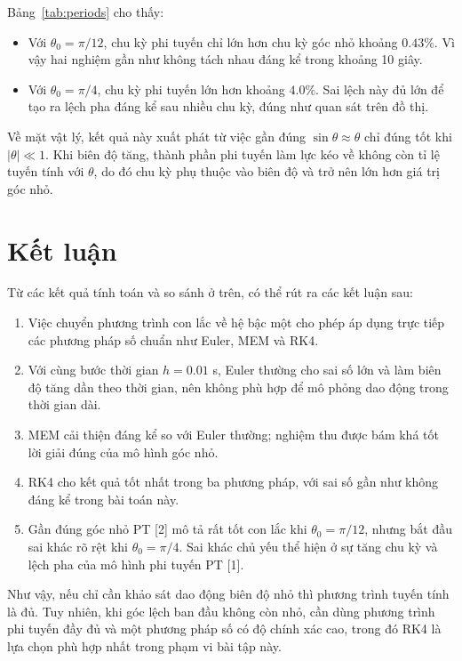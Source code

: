 \documentclass{article}
\begin{document}
Bảng~\ref{tab:periods} cho thấy:
\begin{itemize}
    \item Với $\theta_0=\pi/12$, chu kỳ phi tuyến chỉ lớn hơn chu kỳ góc nhỏ khoảng $0.43\%$. Vì vậy hai nghiệm gần như không tách nhau đáng kể trong khoảng 10 giây.
    \item Với $\theta_0=\pi/4$, chu kỳ phi tuyến lớn hơn khoảng $4.0\%$. Sai lệch này đủ lớn để tạo ra lệch pha đáng kể sau nhiều chu kỳ, đúng như quan sát trên đồ thị.
\end{itemize}

Về mặt vật lý, kết quả này xuất phát từ việc gần đúng $\sin\theta \approx \theta$ chỉ đúng tốt khi $|\theta| \ll 1$. Khi biên độ tăng, thành phần phi tuyến làm lực kéo về không còn tỉ lệ tuyến tính với $\theta$, do đó chu kỳ phụ thuộc vào biên độ và trở nên lớn hơn giá trị góc nhỏ.

\section{Kết luận}

Từ các kết quả tính toán và so sánh ở trên, có thể rút ra các kết luận sau:
\begin{enumerate}
    \item Việc chuyển phương trình con lắc về hệ bậc một cho phép áp dụng trực tiếp các phương pháp số chuẩn như Euler, MEM và RK4.
    \item Với cùng bước thời gian $h=0.01$ s, Euler thường cho sai số lớn và làm biên độ tăng dần theo thời gian, nên không phù hợp để mô phỏng dao động trong thời gian dài.
    \item MEM cải thiện đáng kể so với Euler thường; nghiệm thu được bám khá tốt lời giải đúng của mô hình góc nhỏ.
    \item RK4 cho kết quả tốt nhất trong ba phương pháp, với sai số gần như không đáng kể trong bài toán này.
    \item Gần đúng góc nhỏ PT [2] mô tả rất tốt con lắc khi $\theta_0=\pi/12$, nhưng bắt đầu sai khác rõ rệt khi $\theta_0=\pi/4$. Sai khác chủ yếu thể hiện ở sự tăng chu kỳ và lệch pha của mô hình phi tuyến PT [1].
\end{enumerate}

Như vậy, nếu chỉ cần khảo sát dao động biên độ nhỏ thì phương trình tuyến tính là đủ. Tuy nhiên, khi góc lệch ban đầu không còn nhỏ, cần dùng phương trình phi tuyến đầy đủ và một phương pháp số có độ chính xác cao, trong đó RK4 là lựa chọn phù hợp nhất trong phạm vi bài tập này.
\end{document}
